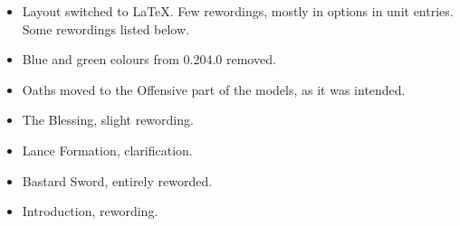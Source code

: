 
\subtitle{0.204.1}

\subtitle{General}

\begin{itemize}[label={-}]
\item Layout switched to LaTeX. Few rewordings, mostly in options in unit entries. Some rewordings listed below.
\item Blue and green colours from 0.204.0 removed.
\item Oaths moved to the Offensive part of the models, as it was intended.
\end{itemize}


%

\subtitle{Army Model Rules}

\begin{itemize}[label={-}]
\item The Blessing, slight rewording.
\item Lance Formation, clarification.
\item Bastard Sword, entirely reworded.
\end{itemize}

\subtitle{Oaths}

\begin{itemize}[label={-}]
\item Introduction, rewording.
\end{itemize}

%

%

%

%

%

%

%

